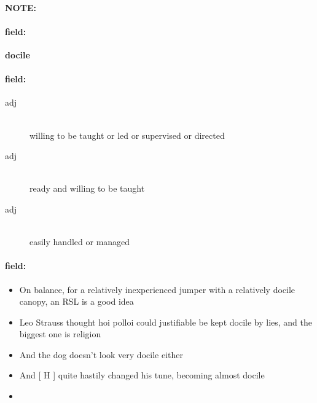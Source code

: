 \documentclass[12pt]{article}
\newenvironment{note}{\paragraph{NOTE:}}{}
\newenvironment{field}{\paragraph{field:}}{}
\begin{document}
\begin{note}
\begin{field}
\textbf{\large docile}
\end{field}


\begin{field}
\begin{description}
\item[adj] \hfill \\ 
willing to be taught or led or supervised or directed

\item[adj] \hfill \\ 
ready and willing to be taught

\item[adj] \hfill \\ 
easily handled or managed

\end{description}
\end{field}

\begin{field}
\begin{itemize}
\item On balance, for a relatively inexperienced jumper with a relatively docile canopy, an RSL is a good idea
\item Leo Strauss thought hoi polloi could justifiable be kept docile by lies, and the biggest one is religion
\item And the dog doesn't look very docile either
\item And [ H ] quite hastily changed his tune, becoming almost docile
\item 
\end{itemize}
\end{field}
\end{note}
\end{document}
